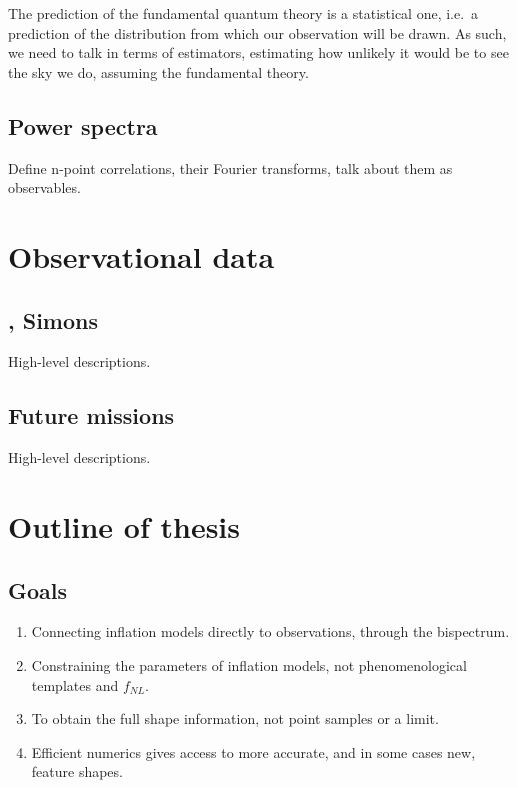     The prediction of the fundamental quantum theory is a statistical one,
    i.e.\ a prediction of the distribution from which our observation will be drawn.
    As such, we need to talk in terms of estimators, estimating how unlikely it
    would be to see the sky we do, assuming the fundamental theory.
\newpage
    \subsection{Power spectra}
    Define n-point correlations, their Fourier transforms, talk about them as observables.
\newpage
\section{Observational data}
    \subsection{\planck, Simons} 
    High-level descriptions.
\newpage
    \subsection{Future missions}
    High-level descriptions.
\newpage
\section{Outline of thesis}
    \subsection{Goals}
    \begin{enumerate}
        \item Connecting inflation models directly to observations,
            through the bispectrum.
        \item Constraining the parameters of inflation models, not phenomenological templates and $f_{NL}$.
        \item To obtain the full shape information, not point samples or a limit.
        \item Efficient numerics gives access to more accurate, and in some cases new, feature shapes.
    \end{enumerate}
\newpage
